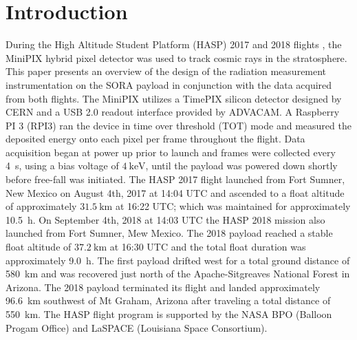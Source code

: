 \section{Introduction}
\label{Introduction}

During the High Altitude Student Platform (HASP) 2017 and 2018 flights \cite{hasp}, the MiniPIX hybrid pixel detector\cite{minipix} was used to track cosmic rays in the stratosphere. 
%
This paper presents an overview of the design of the radiation measurement  instrumentation on the SORA payload in conjunction with the data acquired  from both flights.
%
The MiniPIX utilizes a TimePIX\cite{timepix} silicon detector designed by CERN\cite{cern} and a USB 2.0 readout interface provided by ADVACAM\cite{advacam}. 
%
A Raspberry PI 3 (RPI3) ran the device in time over threshold (TOT) mode and measured the deposited energy onto each pixel per frame throughout the flight. 
%
Data acquisition began at power up prior to launch and frames were collected every \SI{4}{\second}, using a bias voltage of $\SI{4}{\kilo\electronvolt}$, until the payload was powered down shortly before free-fall was initiated. 
%
The HASP 2017 flight launched from Fort Sumner, New Mexico on August 4th, 2017 at 14:04 UTC and ascended to a float altitude of approximately $\SI{31.5}{\kilo\meter}$ at 16:22 UTC; which was maintained for approximately \SI{10.5}{\hour}. On September 4th, 2018 at 14:03 UTC the HASP 2018 mission also launched from Fort Sumner, Mew Mexico.  The 2018 payload reached a stable float altitude of $\SI{37.2}{\kilo\meter}$ at 16:30 UTC and the total float duration was approximately \SI{9.0}{\hour}.
%
 The first payload drifted west for a total ground distance of \SI{580}{\kilo\meter} and was recovered just north of the Apache-Sitgreaves National Forest in Arizona. 
 The 2018 payload terminated its flight and landed approximately \SI{96.6}{\kilo\meter} southwest of Mt Graham, Arizona after traveling a total distance of \SI{550}{\kilo\meter}.
 The HASP flight program is supported by the NASA BPO (Balloon Progam Office) and LaSPACE (Louisiana Space Consortium).
